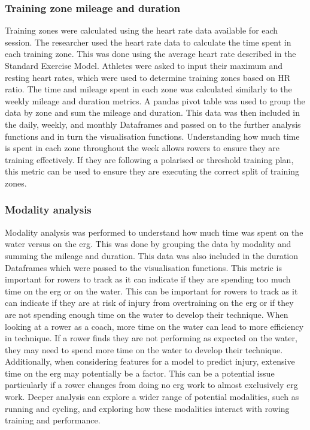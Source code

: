 \subsubsection{Training zone mileage and duration}
Training zones were calculated using the heart rate data available for each session. The researcher used the heart rate data to calculate the time spent in each training zone. This was done using the average heart rate described in the Standard Exercise Model. Athletes were asked to input their maximum and resting heart rates, which were used to determine training zones based on HR ratio. The time and mileage spent in each zone was calculated similarly to the weekly mileage and duration metrics. A pandas pivot table was used to group the data by zone and sum the mileage and duration. This data was then included in the daily, weekly, and monthly Dataframes and passed on to the further analysis functions and in turn the visualisation functions. Understanding how much time is spent in each zone throughout the week allows rowers to ensure they are training effectively. If they are following a polarised or threshold training plan, this metric can be used to ensure they are executing the correct split of training zones.
\subsubsection{Modality analysis}
Modality analysis was performed to understand how much time was spent on the water versus on the erg. This was done by grouping the data by modality and summing the mileage and duration. This data was also included in the duration Dataframes which were passed to the visualisation functions. This metric is important for rowers to track as it can indicate if they are spending too much time on the erg or on the water. This can be important for rowers to track as it can indicate if they are at risk of injury from overtraining on the erg or if they are not spending enough time on the water to develop their technique. When looking at a rower as a coach, more time on the water can lead to more efficiency in technique. If a rower finds they are not performing as expected on the water, they may need to spend more time on the water to develop their technique. Additionally, when considering features for a model to predict injury, extensive time on the erg may potentially be a factor. This can be a potential issue particularly if a rower changes from doing no erg work to almost exclusively erg work. Deeper analysis can explore a wider range of potential modalities, such as running and cycling, and exploring how these modalities interact with rowing training and performance.
